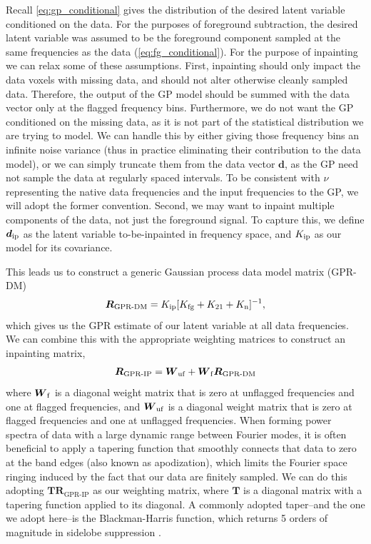 \documentclass[a4paper,fleqn,usenatbib]{mnras}
\def\d{\boldsymbol{d}}
\def\R{\boldsymbol{R}}
\def\T{\boldsymbol{T}}
\def\W{\boldsymbol{W}}
\def\dip{\boldsymbol{d}_{\rm ip}}
\def\Kto{K_{\rm 21}}
\def\Kfg{K_{\rm fg}}
\def\Kn{K_{\rm n}}
\def\Kip{K_{\rm ip}}
\begin{document}
Recall \autoref{eq:gp_conditional} gives the distribution of the desired latent variable conditioned on the data.
For the purposes of foreground subtraction, the desired latent variable was assumed to be the foreground component sampled at the same frequencies as the data (\autoref{eq:fg_conditional}).
For the purpose of inpainting we can relax some of these assumptions.
First, inpainting should only impact the data voxels with missing data, and should not alter otherwise cleanly sampled data.
Therefore, the output of the GP model should be summed with the data vector only at the flagged frequency bins.
Furthermore, we do not want the GP conditioned on the missing data, as it is not part of the statistical distribution we are trying to model.
We can handle this by either giving those frequency bins an infinite noise variance (thus in practice eliminating their contribution to the data model), or we can simply truncate them from the data vector $\d$, as the GP need not sample the data at regularly spaced intervals.
To be consistent with $\nu$ representing the native data frequencies and the input frequencies to the GP, we will adopt the former convention.
Second, we may want to inpaint multiple components of the data, not just the foreground signal.
To capture this, we define $\dip$ as the latent variable to-be-inpainted in frequency space, and $\Kip$ as our model for its covariance.


This leads us to construct a generic Gaussian process data model matrix (GPR-DM)
\begin{align}
\label{eq:gpfm}
\R_{\operatorname{GPR-DM}} = \Kip[\Kfg + \Kto + \Kn]^{-1},
\end{align}
which gives us the GPR estimate of our latent variable at all data frequencies.
We can combine this with the appropriate weighting matrices to construct an inpainting matrix,
\begin{align}
\label{eq:gprip}
\R_{\operatorname{GPR-IP}} = \W_{\rm uf} + \W_{\rm f} \R_{\operatorname{GPR-DM}}
\end{align}
where $\W_{\rm f}$ is a diagonal weight matrix that is zero at unflagged frequencies and one at flagged frequencies, and $\W_{\rm uf}$ is a diagonal weight matrix that is zero at flagged frequencies and one at unflagged frequencies.
When forming power spectra of data with a large dynamic range between Fourier modes, it is often beneficial to apply a tapering function that smoothly connects that data to zero at the band edges (also known as apodization), which limits the Fourier space ringing induced by the fact that our data are finitely sampled.
We can do this adopting $\T\R_{\operatorname{GPR-IP}}$ as our weighting matrix, where $\T$ is a diagonal matrix with a tapering function applied to its diagonal.
A commonly adopted taper--and the one we adopt here--is the Blackman-Harris function, which returns 5 orders of magnitude in sidelobe suppression \citep{Blackman1958}.
\end{document}
